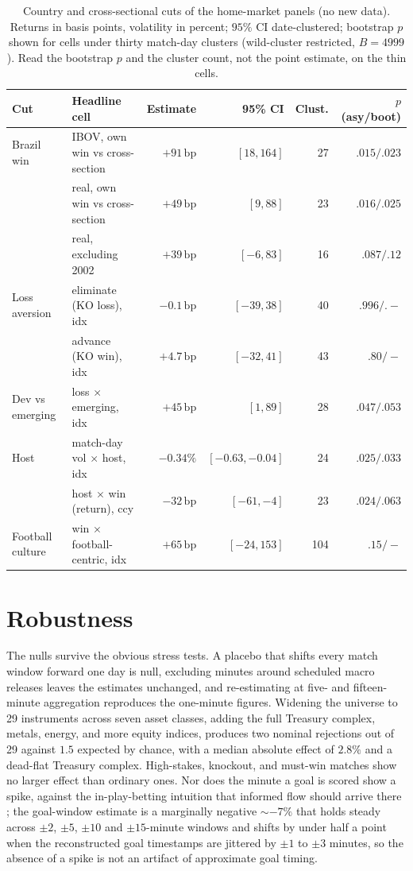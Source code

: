 \documentclass[12pt]{article}
\newcommand{\bp}{\,\text{bp}}
\begin{document}
\begin{table}[h]\centering\footnotesize
\caption{Country and cross-sectional cuts of the home-market panels (no new data). Returns in basis points, volatility in percent; $95\%$ CI date-clustered; bootstrap $p$ shown for cells under thirty match-day clusters (wild-cluster restricted, $B=4999$). Read the bootstrap $p$ and the cluster count, not the point estimate, on the thin cells.}\label{tab:country}
\setlength{\tabcolsep}{5pt}
\begin{tabular}{l>{\raggedright\arraybackslash}p{4.2cm}rrrr}\toprule
Cut & Headline cell & Estimate & 95\% CI & Clust. & $p$ (asy/boot) \\
\midrule
Brazil win & IBOV, own win vs cross-section & $+91\bp$ & $[18,164]$ & 27 & $.015/.023$ \\
 & real, own win vs cross-section & $+49\bp$ & $[9,88]$ & 23 & $.016/.025$ \\
 & \quad real, excluding 2002 & $+39\bp$ & $[-6,83]$ & 16 & $.087/.12$ \\
Loss aversion & eliminate (KO loss), idx & $-0.1\bp$ & $[-39,38]$ & 40 & $.996/.-$ \\
 & advance (KO win), idx & $+4.7\bp$ & $[-32,41]$ & 43 & $.80/-$ \\
Dev vs emerging & loss $\times$ emerging, idx & $+45\bp$ & $[1,89]$ & 28 & $.047/.053$ \\
Host & match-day vol $\times$ host, idx & $-0.34\%$ & $[-0.63,-0.04]$ & 24 & $.025/.033$ \\
 & host $\times$ win (return), ccy & $-32\bp$ & $[-61,-4]$ & 23 & $.024/.063$ \\
Football culture & win $\times$ football-centric, idx & $+65\bp$ & $[-24,153]$ & 104 & $.15/-$ \\
\bottomrule
\end{tabular}
\end{table}

\section{Robustness}\label{sec:robust}
The nulls survive the obvious stress tests. A placebo that shifts every match window forward one day is null, excluding minutes around scheduled macro releases leaves the estimates unchanged, and re-estimating at five- and fifteen-minute aggregation reproduces the one-minute figures. Widening the universe to 29 instruments across seven asset classes, adding the full Treasury complex, metals, energy, and more equity indices, produces two nominal rejections out of 29 against $1.5$ expected by chance, with a median absolute effect of $2.8\%$ and a dead-flat Treasury complex. High-stakes, knockout, and must-win matches show no larger effect than ordinary ones. Nor does the minute a goal is scored show a spike, against the in-play-betting intuition that informed flow should arrive there \cite{croxson2014}; the goal-window estimate is a marginally negative $\sim-7\%$ that holds steady across $\pm2$, $\pm5$, $\pm10$ and $\pm15$-minute windows and shifts by under half a point when the reconstructed goal timestamps are jittered by $\pm1$ to $\pm3$ minutes, so the absence of a spike is not an artifact of approximate goal timing.
\end{document}
